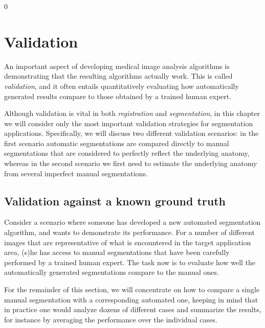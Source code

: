 \documentclass[10pt,twoside]{book}
\def\hideChapterValidation{0}
\begin{document}
\fi

\if\hideChapterValidation0

\chapter{Validation}
\label{chap:validation}

\noindent
An important aspect of developing medical image analysis algorithms is demonstrating that the resulting algorithms actually work.
This is called \emph{validation}, and it often entails quantitatively evaluating how automatically generated results compare
to those obtained by a trained human expert. 

Although validation is vital in both \emph{registration} and \emph{segmentation}, in this chapter we will
consider only the most important validation strategies for segmentation applications. Specifically, we will discuss two different validation scenarios: in the
first scenario automatic segmentations are compared directly to manual segmentations that are considered to perfectly reflect the 
underlying anatomy, whereas in the second scenario we first need to estimate the underlying anatomy from several imperfect manual segmentations. 


\section{Validation against a known ground truth}

Consider a scenario where someone has developed a new automated segmentation algorithm, and wants to demonstrate its performance.
For a number of different images that are representative of what is encountered in the target application area, (s)he has access
to manual segmentations that have been carefully performed by a trained human expert. The task now is to 
evaluate how well the automatically generated segmentations compare to the manual ones.

For the remainder of this section, we will concentrate on how to compare a single manual segmentation with a corresponding automated one, keeping in mind
that in practice one would analyze dozens of different cases and summarize the results, for instance by averaging the performance over the individual cases.
\end{document}
